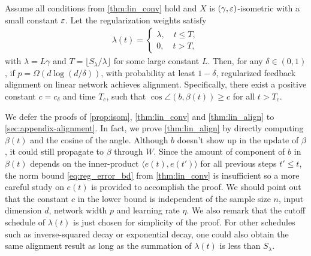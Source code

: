 \begin{theorem}
\label{thm:lin_align}
Assume all conditions from \cref{thm:lin_conv} hold and $X$ is $(\gamma, \varepsilon)$-isometric with a small constant $\varepsilon$. Let the regularization weights satisfy
\begin{align*}
\lambda(t) = 
\begin{cases}
    \lambda, \quad t\leq T,\\
    0, \quad t > T,
\end{cases}
\end{align*}
with $\lambda=L\gamma$ and $T = \lfloor S_\lambda/\lambda\rfloor$ for some large constant $L$. Then, for any $\delta\in(0,1)$, if $p = \Omega(d\log(d/\delta))$, with probability at least $1-\delta$, regularized feedback alignment on linear network achieves alignment. Specifically, there exist a positive constant $c=c_\delta$ and time $T_c$, such that $\cos\angle(b, \beta(t))\geq c$ for all $t>T_c$.
\end{theorem}

We defer the proofs of \cref{prop:isom}, \cref{thm:lin_conv} and \cref{thm:lin_align} to \cref{sec:appendix-alignment}. In fact, we prove \cref{thm:lin_align} by directly computing $\beta(t)$ and the cosine of the angle. Although $b$ doesn't show up in the update of $\beta$, it could still propagate to $\beta$ through $W$. Since the amount of component of $b$ in $\beta(t)$ depends on the inner-product $\langle e(t), e(t')\rangle$ for all previous steps $t'\leq t$, the norm bound \eqref{eq:reg_error_bd} from \cref{thm:lin_conv} is insufficient so a more careful study on $e(t)$ is provided to accomplish the proof. We should point out that the constant $c$ in the lower bound is independent of the sample size $n$, input dimension $d$, network width $p$ and learning rate $\eta$. We also remark that the cutoff schedule of $\lambda(t)$ is just chosen for simplicity of the proof. For other schedules such as inverse-squared decay or exponential decay, one could also obtain the same alignment result as long as the summation of $\lambda(t)$ is less than $S_\lambda$.

